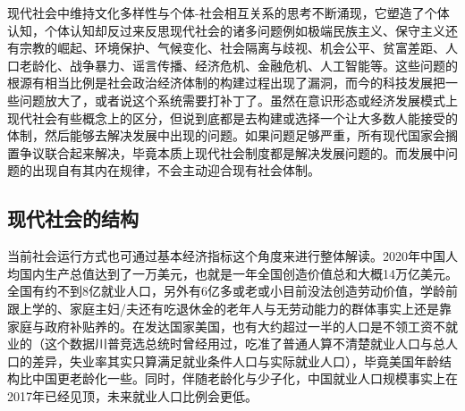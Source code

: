 \documentclass[]{tufte-book}
\newenvironment{Shaded}{}{}
\newcommand{\AttributeTok}[1]{\textcolor[rgb]{0.49,0.56,0.16}{#1}}
\newcommand{\CommentTok}[1]{\textcolor[rgb]{0.38,0.63,0.69}{\textit{#1}}}
\newcommand{\DecValTok}[1]{\textcolor[rgb]{0.25,0.63,0.44}{#1}}
\newcommand{\FunctionTok}[1]{\textcolor[rgb]{0.02,0.16,0.49}{#1}}
\newcommand{\NormalTok}[1]{#1}
\newcommand{\OtherTok}[1]{\textcolor[rgb]{0.00,0.44,0.13}{#1}}
\newcommand{\SpecialCharTok}[1]{\textcolor[rgb]{0.25,0.44,0.63}{#1}}
\newcommand{\StringTok}[1]{\textcolor[rgb]{0.25,0.44,0.63}{#1}}
\begin{document}
现代社会中维持文化多样性与个体-社会相互关系的思考不断涌现，它塑造了个体认知，个体认知却反过来反思现代社会的诸多问题例如极端民族主义、保守主义还有宗教的崛起、环境保护、气候变化、社会隔离与歧视、机会公平、贫富差距、人口老龄化、战争暴力、谣言传播、经济危机、金融危机、人工智能等。这些问题的根源有相当比例是社会政治经济体制的构建过程出现了漏洞，而今的科技发展把一些问题放大了，或者说这个系统需要打补丁了。虽然在意识形态或经济发展模式上现代社会有些概念上的区分，但说到底都是去构建或选择一个让大多数人能接受的体制，然后能够去解决发展中出现的问题。如果问题足够严重，所有现代国家会搁置争议联合起来解决，毕竟本质上现代社会制度都是解决发展问题的。而发展中问题的出现自有其内在规律，不会主动迎合现有社会体制。

\hypertarget{ux73b0ux4ee3ux793eux4f1aux7684ux7ed3ux6784}{%
\subsection{现代社会的结构}\label{ux73b0ux4ee3ux793eux4f1aux7684ux7ed3ux6784}}

当前社会运行方式也可通过基本经济指标这个角度来进行整体解读。2020年中国人均国内生产总值达到了一万美元，也就是一年全国创造价值总和大概14万亿美元。全国有约不到8亿就业人口，另外有6亿多或老或小目前没法创造劳动价值，学龄前跟上学的、家庭主妇/夫还有吃退休金的老年人与无劳动能力的群体事实上还是靠家庭与政府补贴养的。在发达国家美国，也有大约超过一半的人口是不领工资不就业的（这个数据川普竞选总统时曾经用过，吃准了普通人算不清楚就业人口与总人口的差异，失业率其实只算满足就业条件人口与实际就业人口），毕竟美国年龄结构比中国更老龄化一些。同时，伴随老龄化与少子化，中国就业人口规模事实上在2017年已经见顶，未来就业人口比例会更低。

\begin{Shaded}
\end{Shaded}
\end{document}
